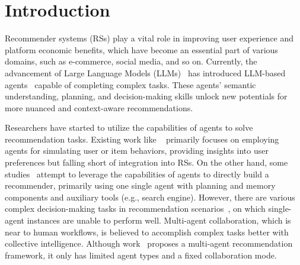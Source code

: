 \section{Introduction}
Recommender systems (RSs) play a vital role in improving user experience and platform economic benefits, which have become an essential part of various domains, such as e-commerce, social media, and so on. 
Currently, the advancement of Large Language Models (LLMs)~\cite{brown2020language, gpt42023technical, touvron2023llama, zeng2022glm} has introduced LLM-based agents~\cite{yao2022react, nakano2021webgpt, shen2023hugginggpt} capable of completing complex tasks. These agents' semantic understanding, planning, and decision-making skills unlock new potentials for more nuanced and context-aware recommendations.

Researchers have started to utilize the capabilities of agents to solve recommendation tasks. 
Existing work like ~\cite{zhang2023generative, wang2023RecAgent, zhang2023agentcf} primarily focuses on employing agents for simulating user or item behaviors, providing insights into user preferences but falling short of integration into RSs.
On the other hand, some studies~\cite{wang2023recmind, huang2023InteRecAgent} attempt to leverage the capabilities of agents to directly build a recommender, primarily using one single agent with planning and memory components and auxiliary tools (e.g., search engine).
However, there are various complex decision-making tasks in recommendation scenarios~\cite{sun2023neighborhood,sun2024collaborative}, on which single-agent instances are unable to perform well.
Multi-agent collaboration, which is near to human workflows, is believed to accomplish complex tasks better with collective intelligence.
Although work~\cite{shu2023rah} proposes a multi-agent recommendation framework, it only has limited agent types and a fixed collaboration mode.

